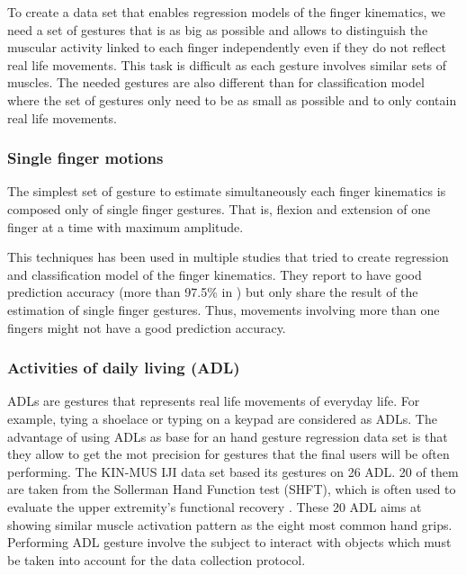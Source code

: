 \documentclass{article}
\begin{document}
To create a data set that enables regression models of the finger kinematics, we need a set of gestures that is as big as possible and allows to distinguish the muscular activity linked to each finger independently even if they do not reflect real life movements. This task is difficult as each gesture involves similar sets of muscles.
The needed gestures are also different than for classification model where the set of gestures only need to be as small as possible and to only contain real life movements.


\subsubsection{Single finger motions}

The simplest set of gesture to estimate simultaneously each finger kinematics is composed only of single finger gestures. That is, flexion and extension of one finger at a time with maximum amplitude. 

This techniques has been used in multiple studies \cite{ref:singleFingerGestPlusSignLang, ref:singleFingerGest1, ref:singleFingerGest2} that tried to create regression and classification model of the finger kinematics. They report to have good prediction accuracy (more than 97.5\% in \cite{ref:singleFingerGestPlusSignLang}) but only share the result of the estimation of single finger gestures. Thus, movements involving more than one fingers might not have a good prediction accuracy.


\subsubsection{Activities of daily living (ADL)}

ADLs are gestures that represents real life movements of everyday life. For example, tying a shoelace or typing on a keypad are considered as ADLs. The advantage of using ADLs as base for an hand gesture regression data set is that they allow to get the mot precision for gestures that the final users will be often performing. The KIN-MUS IJI data set \cite{ref:KinMusUji} based its gestures on 26 ADL. 20 of them are taken from the Sollerman Hand Function test (SHFT), which is often used to evaluate the upper extremity’s functional recovery \cite{doi:SHFT}. These 20 ADL aims at showing similar muscle activation pattern as the eight most common hand grips. Performing ADL gesture involve the subject to interact with objects which must be taken into account for the data collection protocol.
\end{document}
